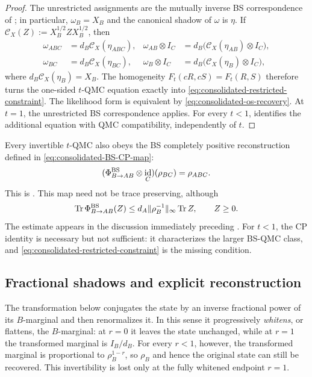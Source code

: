 \documentclass[11pt]{article}
\theoremstyle{remark}
\DeclareMathOperator{\id}{id}
\newcommand{\1}{\mathbbm{1}}
\begin{document}
\begin{proof}
The unrestricted assignments are the mutually inverse BS
correspondence of
\cite[Theorem~3.3 and Remark~3.6]{Bluhm:2025kai}; in particular,
$\omega_B=X_B$ and the canonical shadow of $\omega$ is $\eta$.
If $\mathcal C_X(Z):=X_B^{1/2}ZX_B^{1/2}$, then
\begin{equation}
 \begin{aligned}
 \omega_{ABC}&=d_B\mathcal C_X(\eta_{ABC}),&
 \omega_{AB}\otimes I_C
   &=d_B\bigl(\mathcal C_X(\eta_{AB})\otimes I_C\bigr),\\
 \omega_{BC}&=d_B\mathcal C_X(\eta_{BC}),&
 \omega_B\otimes I_C
   &=d_B\bigl(\mathcal C_X(\eta_B)\otimes I_C\bigr),
 \end{aligned}
\end{equation}
where $d_B\mathcal C_X(\eta_B)=X_B$.
The homogeneity $F_t(cR,cS)=F_t(R,S)$ therefore turns the
one-sided $t$-QMC equation exactly into
\eqref{eq:consolidated-restricted-constraint}.  The likelihood form
is equivalent by \eqref{eq:consolidated-os-recovery}.  At $t=1$,
the unrestricted BS correspondence applies.  For every $t<1$,
 identifies the
additional equation with QMC compatibility, independently
of $t$.
\end{proof}

Every invertible $t$-QMC also obeys the BS completely positive
reconstruction defined in \eqref{eq:consolidated-BS-CP-map}:
\begin{equation}
 (\Phi_{B\to AB}^{\rm BS}\otimes\id_C)(\rho_{BC})
 =\rho_{ABC}.
 \label{eq:consolidated-BS-CP-recovery}
\end{equation}
This is \cite[Corollary~3.9]{Bluhm:2025kai}.
This map need not be trace preserving, although
\begin{equation}
 \operatorname{Tr}\Phi_{B\to AB}^{\rm BS}(Z)
 \leq d_A\lVert\rho_B^{-1}\rVert_\infty\operatorname{Tr} Z,\qquad Z\geq0.
\end{equation}
The estimate appears in the discussion immediately preceding
\cite[Corollary~3.9]{Bluhm:2025kai}.
For $t<1$, the CP identity is necessary but not sufficient: it
characterizes the larger BS-QMC class, and
\eqref{eq:consolidated-restricted-constraint} is the missing
condition.

\subsection{Fractional shadows and explicit reconstruction}

The transformation below conjugates the state by an inverse
fractional power of its $B$-marginal and then renormalizes it.  In
this sense it progressively \emph{whitens}, or flattens, the
$B$-marginal: at $r=0$ it leaves the state unchanged, while at $r=1$
the transformed marginal is $I_B/d_B$.  For every $r<1$, however,
the transformed marginal is proportional to $\rho_B^{1-r}$, so
$\rho_B$ and hence the original state can still be recovered.  This
invertibility is lost only at the fully whitened endpoint $r=1$.
\end{document}
